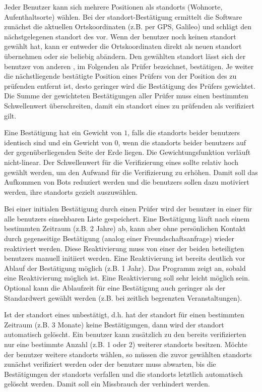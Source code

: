 \documentclass[10pt]{article}
\begin{document}
Jeder Benutzer kann sich mehrere Positionen als \glspl{standort} (Wohnorte, Aufenthaltsorte) wählen. Bei der \gls{standort}-Bestätigung ermittelt die Software zunächst die aktuellen Ortskoordinaten (z.B. per GPS, Galileo) und schlägt den nächstgelegenen \gls{standort} des  vor. Wenn der \gls{benutzer} noch keinen \gls{standort} gewählt hat, kann er entweder die Ortskoordinaten direkt als neuen \gls{standort} übernehmen oder sie beliebig abändern. Den gewählten \gls{standort} lässt sich der \gls{benutzer} von anderen , im Folgenden als Prüfer bezeichnet, bestätigen. Je weiter die nächstliegende bestätigte Position eines Prüfers von der Position des zu prüfenden  entfernt ist, desto geringer wird die Bestätigung des Prüfers gewichtet. Die Summe der gewichteten Bestätigungen aller Prüfer muss einen bestimmten Schwellenwert überschreiten, damit ein \gls{standort} eines zu prüfenden  als verifiziert gilt.

Eine Bestätigung hat ein Gewicht von $1$, falls die \glspl{standort} beider \glspl{benutzer} identisch sind und ein Gewicht von $0$, wenn die \glspl{standort} beider \glspl{benutzer} auf der gegenüberliegenden Seite der Erde liegen. Die Gewichtungsfunktion verläuft nicht-linear. Der Schwellenwert für die Verifizierung eines  sollte relativ hoch gewählt werden, um den Aufwand für die Verifizierung zu erhöhen. Damit soll das Aufkommen von Bots reduziert werden und die \glspl{benutzer} sollen dazu motiviert werden, ihre \glspl{standort} gezielt auszuwählen.

Bei einer initialen Bestätigung durch einen Prüfer wird der \gls{benutzer} in einer für alle \glspl{benutzer} einsehbaren Liste gespeichert. Eine Bestätigung läuft nach einem bestimmten Zeitraum (z.B. 2 Jahre) ab, kann aber ohne persönlichen Kontakt durch gegenseitige Bestätigung (analog einer Freundschaftsanfrage) wieder reaktiviert werden. Diese Reaktivierung muss von einer der beiden beteiligten \glspl{benutzer} manuell initiiert werden. Eine Reaktivierung ist bereits deutlich vor Ablauf der Bestätigung möglich (z.B. 1 Jahr). Das Programm zeigt an, sobald eine Reaktivierung möglich ist. Eine Reaktivierung soll sehr leicht möglich sein. Optional kann die Ablaufzeit für eine Bestätigung auch geringer als der Standardwert gewählt werden (z.B. bei zeitlich begrenzten Veranstaltungen).

Ist der \gls{standort} eines  unbestätigt, d.h. hat der \gls{standort} für einen bestimmten Zeitraum (z.B. 3 Monate) keine Bestätigungen, dann wird der \gls{standort} automatisch gelöscht. Ein \gls{benutzer} kann zusätzlich zu den bereits verifizierten  nur eine bestimmte Anzahl (z.B. 1 oder 2) weiterer \glspl{standort} besitzen. Möchte der \gls{benutzer} weitere \glspl{standort} wählen, so müssen die zuvor gewählten \glspl{standort} zunächst verifiziert werden oder der \gls{benutzer} muss abwarten, bis die Bestätigungen der \glspl{standort} verfallen und die \glspl{standort} letztlich automatisch gelöscht werden. Damit soll ein Missbrauch der  verhindert werden.
\end{document}
